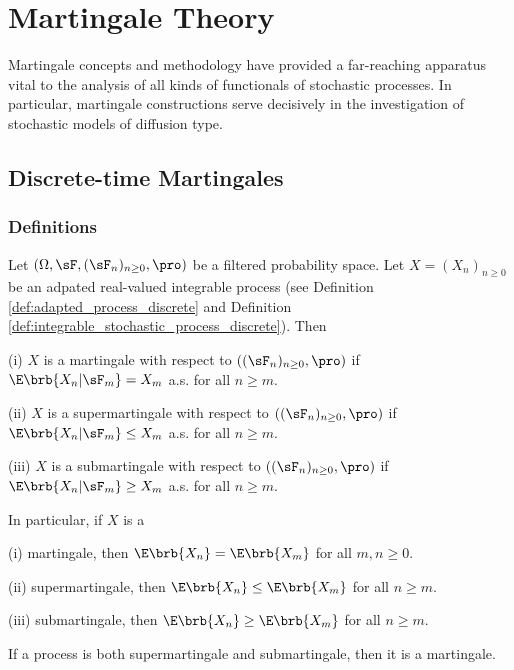 \chapter{Martingale Theory}

Martingale concepts and methodology have provided a far-reaching apparatus vital to the analysis of all kinds of functionals of stochastic processes. In particular, martingale constructions serve decisively in the investigation of stochastic models of diffusion type.\cite{Karlin_Taylor_1975}

\section{Discrete-time Martingales}

\subsection{Definitions}

\begin{definition}\label{def:martingale_super_sub_discrete}
Let $(\Omega,\sF, (\sF_n)_{n\geq 0},\pro)$ be a filtered probability space. Let $X = (X_n)_{n\geq 0}$ be an adpated real-valued integrable process (see Definition \ref{def:adapted_process_discrete} and Definition \ref{def:integrable_stochastic_process_discrete}). Then
\ben
\item [(i)] $X$ is a martingale with respect to $((\sF_n)_{n\geq 0},\pro)$ if $\E\brb{X_n | \sF_m} = X_m$ a.s. for all $n \geq m$.
\item [(ii)] $X$ is a supermartingale with respect to $((\sF_n)_{n\geq 0},\pro)$ if $\E\brb{X_n | \sF_m}\leq X_m$ a.s. for all $n\geq m$.
\item [(iii)] $X$ is a submartingale with respect to $((\sF_n)_{n\geq 0},\pro)$ if $\E\brb{X_n | \sF_m} \geq X_m$ a.s. for all $n\geq m$.
\een

In particular, if $X$ is a
\ben
\item [(i)] martingale, then $\E\brb{X_n} = \E\brb{X_m}$ for all $m,n\geq 0$.
\item [(ii)] supermartingale, then $\E\brb{X_n} \leq \E\brb{X_m}$ for all $n\geq m$.
\item [(iii)] submartingale, then $\E\brb{X_n} \geq \E\brb{X_m}$ for all $n\geq m$.
\een
\end{definition}

\begin{remark}
If a process is both supermartingale and submartingale, then it is a martingale.
\end{remark}



